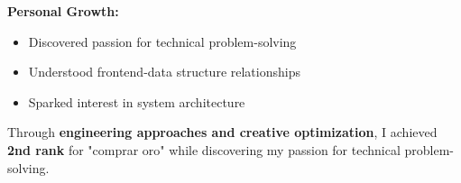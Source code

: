 \documentclass[a4paper,10pt]{article}
\begin{document}
\vspace{0.2cm}
\textbf{Personal Growth:}
\vspace{0.2cm}
\begin{itemize}[label=\textcolor{darkblue}{\textbullet}, leftmargin=*, nosep]
	\item Discovered passion for technical problem-solving
	\item Understood frontend-data structure relationships
	\item Sparked interest in system architecture
\end{itemize}

\vspace{0.2cm}


Through \textbf{engineering approaches and creative optimization}, I achieved \textbf{2nd
	rank} for "comprar oro" while discovering my passion for technical problem-solving.


\vspace{0.2cm} %



\end{document}
